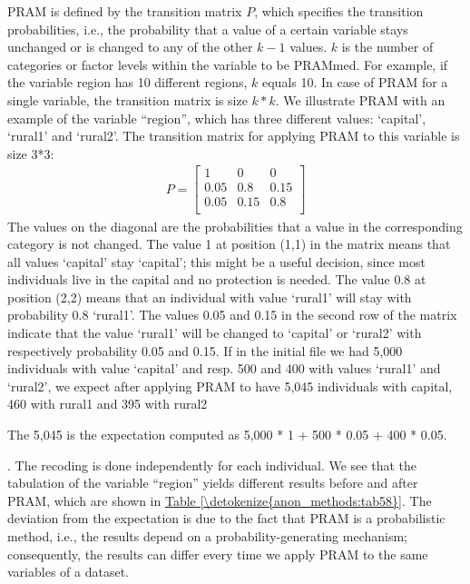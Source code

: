 \documentclass[letterpaper,10pt,english]{sphinxmanual}
\begin{document}
PRAM is defined by the transition matrix \(P\), which specifies the
transition probabilities, i.e., the probability that a value of a
certain variable stays unchanged or is changed to any of the other
\(k - 1\) values. \(k\) is the number of categories or factor
levels within the variable to be PRAMmed. For example, if the variable
region has 10 different regions, \(k\) equals 10. In case of PRAM
for a single variable, the transition matrix is size \(k*k\). We
illustrate PRAM with an example of the variable “region”, which has
three different values: ‘capital’, ‘rural1’ and ‘rural2’. The transition
matrix for applying PRAM to this variable is size 3*3:
\begin{equation*}
\begin{split}P = \begin{bmatrix}
1 & 0 & 0 \\
0.05 & 0.8 & 0.15 \\
0.05 & 0.15 & 0.8 \\
\end{bmatrix}\end{split}
\end{equation*}
The values on the diagonal are the probabilities that a value in the
corresponding category is not changed. The value 1 at position (1,1) in
the matrix means that all values ‘capital’ stay ‘capital’; this might be
a useful decision, since most individuals live in the capital and no
protection is needed. The value 0.8 at position (2,2) means that an
individual with value ‘rural1’ will stay with probability 0.8 ‘rural1’.
The values 0.05 and 0.15 in the second row of the matrix indicate that
the value ‘rural1’ will be changed to ‘capital’ or ‘rural2’ with
respectively probability 0.05 and 0.15. If in the initial file we had
5,000 individuals with value ‘capital’ and resp. 500 and 400 with values
‘rural1’ and ‘rural2’, we expect after applying PRAM to have 5,045
individuals with capital, 460 with rural1 and 395 with
rural2 %
\begin{footnote}[9]\sphinxAtStartFootnote
The 5,045 is the expectation computed as 5,000 * 1 + 500 * 0.05 +
400 * 0.05.
%
\end{footnote}. The recoding is done independently for
each individual. We see that the tabulation of the variable “region”
yields different results before and after PRAM, which are shown in \hyperref[\detokenize{anon_methods:tab58}]{Table \ref{\detokenize{anon_methods:tab58}}}.
The deviation from the expectation is due to the fact that PRAM is
a probabilistic method, i.e., the results depend on a
probability-generating mechanism; consequently, the results can differ
every time we apply PRAM to the same variables of a dataset.
\end{document}
